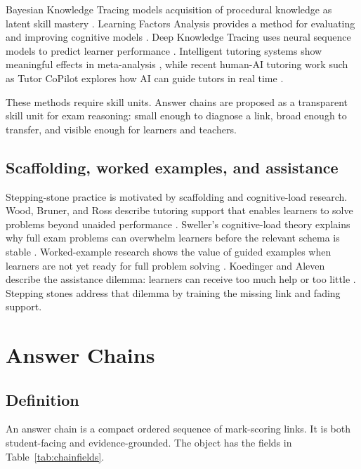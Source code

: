 \documentclass[11pt]{article}
\begin{document}
Bayesian Knowledge Tracing models acquisition of procedural knowledge as latent skill mastery \cite{corbett1994}. Learning Factors Analysis provides a method for evaluating and improving cognitive models \cite{cen2006}. Deep Knowledge Tracing uses neural sequence models to predict learner performance \cite{piech2015}. Intelligent tutoring systems show meaningful effects in meta-analysis \cite{kulik2016}, while recent human-AI tutoring work such as Tutor CoPilot explores how AI can guide tutors in real time \cite{wang2024}.

These methods require skill units. Answer chains are proposed as a transparent skill unit for exam reasoning: small enough to diagnose a link, broad enough to transfer, and visible enough for learners and teachers.

\subsection{Scaffolding, worked examples, and assistance}

Stepping-stone practice is motivated by scaffolding and cognitive-load research. Wood, Bruner, and Ross describe tutoring support that enables learners to solve problems beyond unaided performance \cite{wood1976}. Sweller's cognitive-load theory explains why full exam problems can overwhelm learners before the relevant schema is stable \cite{sweller1988}. Worked-example research shows the value of guided examples when learners are not yet ready for full problem solving \cite{renkl2002}. Koedinger and Aleven describe the assistance dilemma: learners can receive too much help or too little \cite{koedinger2007}. Stepping stones address that dilemma by training the missing link and fading support.

\section{Answer Chains}

\subsection{Definition}

An answer chain is a compact ordered sequence of mark-scoring links. It is both student-facing and evidence-grounded. The object has the fields in Table~\ref{tab:chainfields}.
\end{document}
